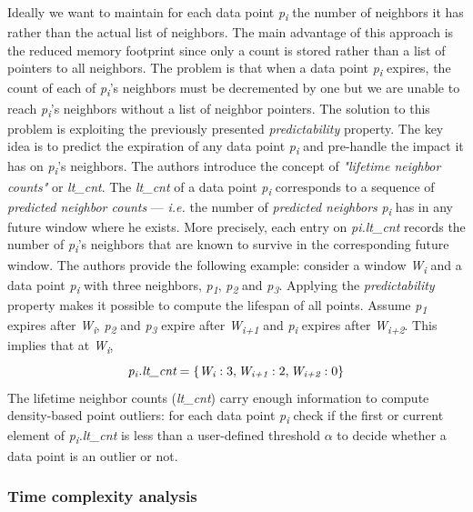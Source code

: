 Ideally we want to maintain for each data point \textit{p\textsubscript{i}} the number of neighbors it has rather than the actual list of neighbors. The main advantage of this approach is the reduced memory footprint since only a count is stored rather than a list of pointers to all neighbors. The problem is that when a data point \textit{p\textsubscript{i}} expires, the count of each of \textit{p\textsubscript{i}}'s neighbors must be decremented by one but we are unable to reach \textit{p\textsubscript{i}}'s neighbors without a list of neighbor pointers. The solution to this problem is exploiting the previously presented \textit{predictability} property. The key idea is to predict the expiration of any data point \textit{p\textsubscript{i}} and pre-handle the impact it has on \textit{p\textsubscript{i}}'s neighbors. The authors introduce the concept of \textit{"lifetime neighbor counts"} or \textit{lt\_cnt}. The \textit{lt\_cnt} of a data point \textit{p\textsubscript{i}} corresponds to a sequence of \textit{predicted neighbor counts} --- \textit{i.e.} the number of \textit{predicted neighbors} \textit{p\textsubscript{i}} has in any future window where he exists. More precisely, each entry on \textit{pi.lt\_cnt} records the number of \textit{p\textsubscript{i}}'s neighbors that are known to survive in the corresponding future window. The authors provide the following example: consider a window \textit{W\textsubscript{i}} and a data point \textit{p\textsubscript{i}} with three neighbors, \textit{p\textsubscript{1}}, \textit{p\textsubscript{2}} and \textit{p\textsubscript{3}}. Applying the \textit{predictability} property makes it possible to compute the lifespan of all points. Assume \textit{p\textsubscript{1}} expires after \textit{W\textsubscript{i}}, \textit{p\textsubscript{2}} and \textit{p\textsubscript{3}} expire after \textit{W\textsubscript{i+1}} and \textit{p\textsubscript{i}} expires after \textit{W\textsubscript{i+2}}. This implies that at \textit{W\textsubscript{i}}, 
\[ \textit{p\textsubscript{i}.lt\_cnt} = \{\textit{W\textsubscript{i}}: 3, \textit{W\textsubscript{i+1}}: 2, \textit{W\textsubscript{i+2}}: 0\} \]
The lifetime neighbor counts (\textit{lt\_cnt}) carry enough information to compute density-based point outliers: for each data point \textit{p\textsubscript{i}} check if the first or current element of \textit{p\textsubscript{i}.lt\_cnt} is less than a user-defined threshold $\alpha$ to decide whether a data point is an outlier or not.

\subsubsection*{Time complexity analysis}

